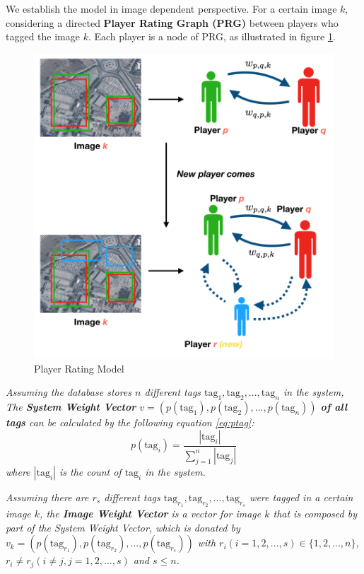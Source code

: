We establish the model in image dependent perspective. For a certain image $k$,
considering a directed \textbf{Player Rating Graph (PRG)\label{idx:prg}} 
between players who tagged the image $k$. Each player is a node of PRG, 
as illustrated in figure \ref{fig:graph}. 

\begin{figure}[htp]
\centering
\includegraphics[width=0.5\columnwidth]{figures/graph2}
\caption{Player Rating Model}
\label{fig:graph}
\end{figure}

\begin{definition}
\label{def:weightv}
\emph{
Assuming the database stores $n$ different tags $\text{tag}_1, \text{tag}_2, ..., \text{tag}_n$ in the system,
The \textbf{System Weight Vector} $v = (p(\text{tag}_1), p(\text{tag}_2), ..., p(\text{tag}_n))$ 
\textbf{of all tags} can be calculated by the following equation \ref{eq:ptag}:
\begin{equation}
\label{eq:ptag}
p(\text{tag}_i) = \frac{|\text{tag}_i|}{\sum_{j=1}^{n}{|\text{tag}_j|}}
\end{equation}
where  $|\text{tag}_i|$ is the count of $\text{tag}_i$ in the system.
}
\end{definition}
\begin{definition}
\label{def:weightvk}
\emph{
Assuming there are $r_s$ different tags $\text{tag}_{r_1}, \text{tag}_{r_2}, ..., \text{tag}_{r_s}$ were tagged in
a certain image $k$, the \textbf{Image Weight Vector} is a vector for image $k$ that is
composed by part of the System Weight Vector, which 
is donated by $v_k = (p(\text{tag}_{r_1}), p(\text{tag}_{r_2}), ..., p(\text{tag}_{r_s}))$
with $r_i (i=1,2,...,s) \in \{1, 2, ..., n\}$, $r_i \neq r_j (i\neq j, j=1,2,...,s)$ and $s \leq n$.
}
\end{definition}

